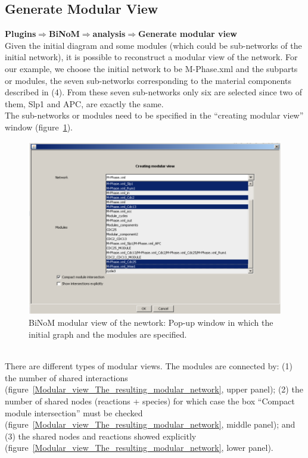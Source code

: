 \subsection{Generate Modular View}
\textbf{Plugins$\Rightarrow$BiNoM$\Rightarrow$analysis$\Rightarrow$Generate modular view}\\
Given the initial diagram and some modules (which could be sub-networks of the initial network), it is possible to reconstruct a modular view of the network. For our example, we choose the initial network to be M-Phase.xml and the subparts or modules, the seven sub-networks corresponding to the material components described in (4). From these seven sub-networks only six are selected since two of them, Slp1 and APC, are exactly the same.\\
The sub-networks or modules need to be specified in the “creating modular view” window (figure~\ref{Modular_view_Pop-up_window}).\\
\begin{figure}
\centering
\includegraphics[width=14 cm]{graphics/Modular_view_Pop-up_window}
\caption{BiNoM modular view of the newtork: Pop-up window in which the initial graph and the modules are specified. }
\label{Modular_view_Pop-up_window}
\end{figure}
\\There are different types of modular views. The modules are connected by: (1) the number of shared interactions (figure~\ref{Modular_view_The_resulting_modular_network}, upper panel); (2) the number of shared nodes (reactions + species) for which case the box “Compact module intersection” must be checked (figure~\ref{Modular_view_The_resulting_modular_network}, middle panel); and (3) the shared nodes and reactions showed explicitly (figure~\ref{Modular_view_The_resulting_modular_network}, lower panel).
